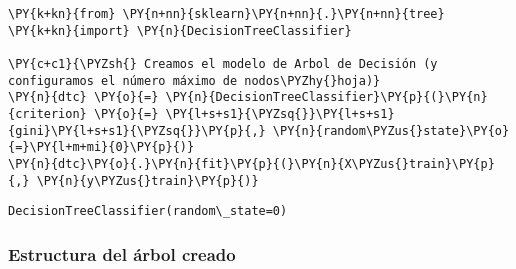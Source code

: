     \begin{tcolorbox}[breakable, size=fbox, boxrule=1pt, pad at break*=1mm,colback=cellbackground, colframe=cellborder]
\begin{Verbatim}[commandchars=\\\{\}]
\PY{k+kn}{from} \PY{n+nn}{sklearn}\PY{n+nn}{.}\PY{n+nn}{tree} \PY{k+kn}{import} \PY{n}{DecisionTreeClassifier}

\PY{c+c1}{\PYZsh{} Creamos el modelo de Arbol de Decisión (y configuramos el número máximo de nodos\PYZhy{}hoja)}
\PY{n}{dtc} \PY{o}{=} \PY{n}{DecisionTreeClassifier}\PY{p}{(}\PY{n}{criterion} \PY{o}{=} \PY{l+s+s1}{\PYZsq{}}\PY{l+s+s1}{gini}\PY{l+s+s1}{\PYZsq{}}\PY{p}{,} \PY{n}{random\PYZus{}state}\PY{o}{=}\PY{l+m+mi}{0}\PY{p}{)}
\PY{n}{dtc}\PY{o}{.}\PY{n}{fit}\PY{p}{(}\PY{n}{X\PYZus{}train}\PY{p}{,} \PY{n}{y\PYZus{}train}\PY{p}{)}
\end{Verbatim}
\end{tcolorbox}

            \begin{tcolorbox}[breakable, size=fbox, boxrule=.5pt, pad at break*=1mm, opacityfill=0]
\begin{Verbatim}[commandchars=\\\{\}]
DecisionTreeClassifier(random\_state=0)
\end{Verbatim}
\end{tcolorbox}
        
    \hypertarget{estructura-del-uxe1rbol-creado}{%
\subsubsection{Estructura del árbol creado}\label{estructura-del-uxe1rbol-creado}}

